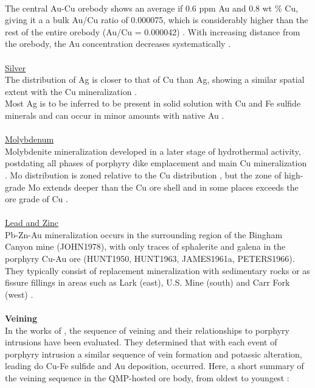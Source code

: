 \documentclass[a4paper,11pt,titlepage]{article}
\begin{document}
\\ The central Au-Cu orebody shows an average if 0.6 ppm Au and 0.8 wt \% Cu, giving it a a bulk Au/Cu ratio of 0.000075, which is considerably higher than the rest of the entire orebody (Au/Cu = 0.000042) \citep{Redmond2004,Gruen2010}. With increasing distance from the orebody, the Au concentration decreases systematically \citep{Gruen2010}.
\\
\\\underline{Silver}
\\ The distribution of Ag is closer to that of Cu than Ag, showing a similar spatial extent with the Cu mineralization \citep{Landtwing2004}.
\\Most Ag is to be inferred to be present in solid solution with Cu and Fe sulfide minerals and can occur in minor amounts with native Au \citep{Ballantyne1997}.
\\
\\\underline{Molybdenum}
\\ Molybdenite mineralization developed in a later stage of hydrothermal activity, postdating all phases of porphyry dike emplacement and main Cu mineralization \citep{Landtwing2004}. Mo distribution is zoned relative to the Cu distribution \citep{Atkinson1978a}, but the zone of high-grade Mo extends deeper than the Cu ore shell and in some places exceeds the ore grade of Cu \citep{Gruen2010}.
\\
\\\underline{Lead and Zinc}
\\ Pb-Zn-Au mineralization occurs in the surrounding region of the Bingham Canyon mine (JOHN1978), with only traces of sphalerite and galena in the porphyry Cu-Au ore (HUNT1950, HUNT1963, JAMES1961a, PETERS1966). They typically consist of replacement mineralization with sedimentary rocks or as fissure fillings in areas such as Lark (east), U.S. Mine (south) and Carr Fork (west) \citep{Atkinson1978a,Reid1978,Babcock1995,Harrison1997,Landtwing2004}.
\\
\\\textbf{Veining}
\\ In the works of \citet{Phillips1997, Redmond2001, Redmond2002, Redmond2010a}, the sequence of veining and their relationships to porphyry intrusions have been evaluated. They determined that with each event of porphyry intrusion a similar sequence of vein formation and potassic alteration, leading do Cu-Fe sulfide and Au deposition, occurred. Here, a short summary of the veining sequence in the QMP-hosted ore body, from oldest to youngest \citep{Redmond2001,Landtwing2004}:
\end{document}
